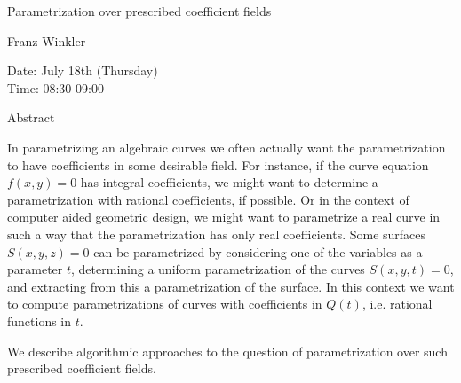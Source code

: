 \begin{center}
\LARGE
Parametrization over prescribed coefficient fields
\end{center}

\begin{center}
\Large
Franz Winkler
\end{center}

\noindent
Date:  July 18th (Thursday) \\
Time:  08:30-09:00\\

\begin{center}
\large
Abstract
\end{center}

In parametrizing an algebraic curves we often actually want the parametrization to have
coefficients in some desirable field. For instance, if the curve equation $f(x,y)=0$ has integral
coefficients, we might want to determine a parametrization with rational coefficients, if possible.
Or in the context of computer aided geometric design, we might want to parametrize a real curve
in such a way that the parametrization has only real coefficients. Some surfaces $S(x,y,z)=0$ can
be parametrized by considering one of the variables as a parameter $t$, determining a uniform
parametrization of the curves $S(x,y,t)=0$, and extracting from this a parametrization of the
surface. In this context we want to compute parametrizations of curves with coefficients in $Q(t)$,
i.e. rational functions in $t$. 

We describe algorithmic approaches to the question of parametrization over such prescribed
coefficient fields. 

